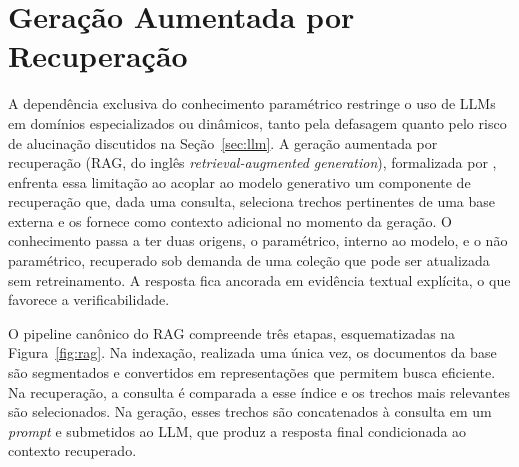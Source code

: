 \section{Geração Aumentada por Recuperação}\label{sec:rag}

A dependência exclusiva do conhecimento paramétrico restringe o uso de LLMs em domínios especializados ou dinâmicos, tanto pela defasagem quanto pelo risco de alucinação discutidos na Seção~\ref{sec:llm}. A geração aumentada por recuperação (RAG, do inglês \textit{retrieval-augmented generation}), formalizada por \citet{lewis2020}, enfrenta essa limitação ao acoplar ao modelo generativo um componente de recuperação que, dada uma consulta, seleciona trechos pertinentes de uma base externa e os fornece como contexto adicional no momento da geração. O conhecimento passa a ter duas origens, o paramétrico, interno ao modelo, e o não paramétrico, recuperado sob demanda de uma coleção que pode ser atualizada sem retreinamento. A resposta fica ancorada em evidência textual explícita, o que favorece a verificabilidade.

O pipeline canônico do RAG compreende três etapas, esquematizadas na Figura~\ref{fig:rag}. Na indexação, realizada uma única vez, os documentos da base são segmentados e convertidos em representações que permitem busca eficiente. Na recuperação, a consulta é comparada a esse índice e os trechos mais relevantes são selecionados. Na geração, esses trechos são concatenados à consulta em um \textit{prompt} e submetidos ao LLM, que produz a resposta final condicionada ao contexto recuperado.

